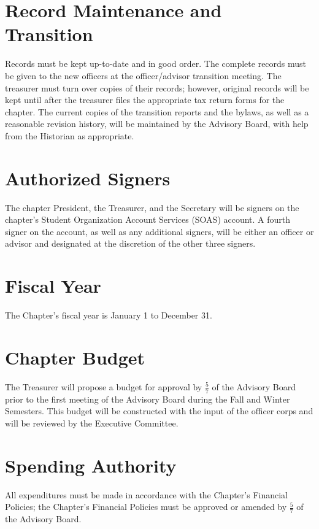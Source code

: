 \section{Record Maintenance and Transition} Records must be kept up-to-date and in good order. The complete records must be given  to the new officers at the officer/advisor transition meeting. The treasurer must turn over copies of their records; however, original records will be kept until after the treasurer files the appropriate tax return forms for the chapter. The current copies of the transition reports and the bylaws, as well as a reasonable revision history, will be maintained by the Advisory Board, with help from the Historian as appropriate.
\section{Authorized Signers} %
 The chapter President, the Treasurer, and the Secretary will be signers on the chapter's Student Organization Account Services (SOAS) account. A fourth signer on the account, as well as any additional signers, will be either an officer or advisor and designated at the discretion of the other three signers.  
\section{Fiscal Year} The Chapter's fiscal year is January 1 to December 31.

\section{Chapter Budget} The Treasurer will propose a budget for approval by $\frac{5}{7}$ of the Advisory Board prior to the first meeting of the Advisory Board during the Fall and Winter Semesters. This budget will be constructed with the input of the officer corps and will be reviewed by the Executive Committee.  %
\section{Spending Authority} All expenditures must be made in accordance with the Chapter’s Financial Policies; the Chapter’s Financial Policies must be approved or amended by $\frac{5}{7}$ of the Advisory Board.
 